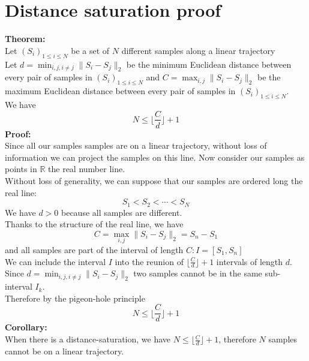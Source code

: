  \section{Distance saturation proof}
 \textbf{Theorem:}\\
 Let $(S_i)_{1 \leq i \leq N}$ be a set of $N$ different samples along a linear trajectory\\[5 mm]
 Let $d=\min_{i, j, i \neq j} \lVert S_i - S_j \rVert_2$ be the minimum Euclidean distance between every pair of samples in $(S_i)_{1 \leq i \leq N}$ and $C=\max_{i, j} \lVert S_i - S_j \rVert_2$ be the maximum Euclidean distance between every pair of samples in $(S_i)_{1 \leq i \leq N}$.\\
 We have
 \[ N \leq \bigg\lfloor \frac{C}{d} \bigg\rfloor +1\]
 \textbf{Proof:}\\
 Since all our samples samples are on a linear trajectory, without loss of information we can
 project the samples on this line.  Now consider our samples as points in $\mathbb{R}$ the
 real number line. \\[5 mm]
 Without loss of generality, we can suppose that our samples are ordered long the real line:
 \[S_1<S_2<\cdots<S_N\]
 We have $d>0$ because all samples are different.\\
 Thanks to the structure of the real line, we have
 \[C=\max_{i, j} \lVert S_i - S_j \rVert_2 = S_n-S_1\]
 and all samples are part of the interval of length $C:I=[S_1,S_n ]$\\
 We can include the interval $I$ into the reunion of $\lfloor \frac{C}{d} \rfloor +1$ intervals of length $d$.\\
 Since $d=\min_{i, j, i \neq j} \lVert S_i - S_j \rVert_2$ two samples cannot be in the same
 sub-interval $I_k$. \\
 Therefore by the pigeon-hole principle\\
  \[ N \leq \bigg\lfloor \frac{C}{d} \bigg\rfloor +1\]
\textbf{Corollary:}\\
When there is a distance-saturation, we have $N \leq \bigg\lfloor \frac{C}{d} \bigg\rfloor +1$, therefore $N$ samples cannot be on a linear trajectory.\\[5 mm]

